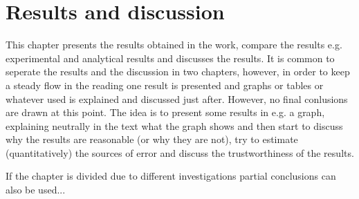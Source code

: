 \chapter{Results and discussion}

This chapter presents the results obtained in the work, compare the results e.g. experimental and analytical results and discusses the results. It is common to seperate the results and the discussion in two chapters, however, in order to keep a steady flow in the reading one result is presented and graphs or tables or whatever used is explained and discussed just after. However, no final conlusions are drawn at this point. The idea is to present some results in e.g. a graph, explaining neutrally in the text what the graph shows and then start to discuss why the results are reasonable (or why they are not), try to estimate (quantitatively) the sources of error and discuss the trustworthiness of the results. 

If the chapter is divided due to different investigations partial conclusions can also be used... 